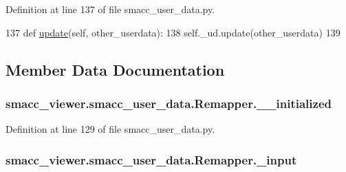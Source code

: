 Definition at line 137 of file smacc\+\_\+user\+\_\+data.\+py.


\begin{DoxyCode}
137     \textcolor{keyword}{def }\hyperlink{classsmacc__viewer_1_1smacc__user__data_1_1Remapper_a81f15d6d84514b34508192ef3044b8db}{update}(self, other\_userdata):
138         self.\_ud.update(other\_userdata)
139 
\end{DoxyCode}


\subsection{Member Data Documentation}
\subsubsection[{\texorpdfstring{\+\_\+\+\_\+initialized}{__initialized}}]{\setlength{\rightskip}{0pt plus 5cm}smacc\+\_\+viewer.\+smacc\+\_\+user\+\_\+data.\+Remapper.\+\_\+\+\_\+initialized\hspace{0.3cm}{\ttfamily [private]}}\hypertarget{classsmacc__viewer_1_1smacc__user__data_1_1Remapper_aa59ac4f6560bf22ba9e411d408184909}{}\label{classsmacc__viewer_1_1smacc__user__data_1_1Remapper_aa59ac4f6560bf22ba9e411d408184909}


Definition at line 129 of file smacc\+\_\+user\+\_\+data.\+py.

\subsubsection[{\texorpdfstring{\+\_\+input}{_input}}]{\setlength{\rightskip}{0pt plus 5cm}smacc\+\_\+viewer.\+smacc\+\_\+user\+\_\+data.\+Remapper.\+\_\+input\hspace{0.3cm}{\ttfamily [private]}}\hypertarget{classsmacc__viewer_1_1smacc__user__data_1_1Remapper_a566aa51939bf0ea5fab1d3928087a51c}{}\label{classsmacc__viewer_1_1smacc__user__data_1_1Remapper_a566aa51939bf0ea5fab1d3928087a51c}


